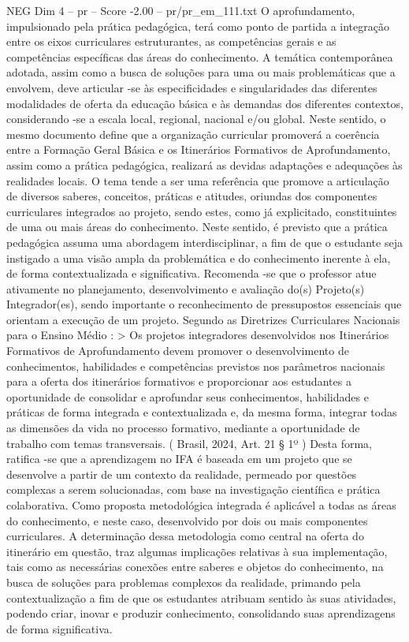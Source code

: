 \begin{textsample}{NEG Dim 4 – pr – Score -2.00 – pr/pr\_em\_111.txt}
O aprofundamento, impulsionado pela prática pedagógica, terá como ponto de partida a integração entre os eixos curriculares estruturantes, as competências gerais e as competências específicas das áreas do conhecimento.
A temática contemporânea adotada, assim como a busca de soluções para uma ou mais problemáticas que a envolvem, deve articular -se às especificidades e singularidades das diferentes modalidades de oferta da educação básica e às demandas dos diferentes contextos, considerando -se a escala local, regional, nacional e/ou global.
Neste sentido, o mesmo documento define que a organização curricular promoverá a coerência entre a Formação Geral Básica e os Itinerários Formativos de Aprofundamento, assim como a prática pedagógica, realizará as devidas adaptações e adequações às realidades locais.
O tema tende a ser uma referência que promove a articulação de diversos saberes, conceitos, práticas e atitudes, oriundas dos componentes curriculares integrados ao projeto, sendo estes, como já explicitado, constituintes de uma ou mais áreas do conhecimento.
Neste sentido, é previsto que a prática pedagógica assuma uma abordagem interdisciplinar, a fim de que o estudante seja instigado a uma visão ampla da problemática e do conhecimento inerente à ela, de forma contextualizada e significativa.
Recomenda -se que o professor atue ativamente no planejamento, desenvolvimento e avaliação do(s) Projeto(s) Integrador(es), sendo importante o reconhecimento de pressupostos essenciais que orientam a execução de um projeto.
Segundo as Diretrizes Curriculares Nacionais para o Ensino Médio : > Os projetos integradores desenvolvidos nos Itinerários Formativos de Aprofundamento devem promover o desenvolvimento de conhecimentos, habilidades e competências previstos nos parâmetros nacionais para a oferta dos itinerários formativos e proporcionar aos estudantes a oportunidade de consolidar e aprofundar seus conhecimentos, habilidades e práticas de forma integrada e contextualizada e, da mesma forma, integrar todas as dimensões da vida no processo formativo, mediante a oportunidade de trabalho com temas transversais. ( Brasil, 2024, Art. 21 § 1º ) Desta forma, ratifica -se que a aprendizagem no IFA é baseada em um projeto que se desenvolve a partir de um contexto da realidade, permeado por questões complexas a serem solucionadas, com base na investigação científica e prática colaborativa.
Como proposta metodológica integrada é aplicável a todas as áreas do conhecimento, e neste caso, desenvolvido por dois ou mais componentes curriculares.
A determinação dessa metodologia como central na oferta do itinerário em questão, traz algumas implicações relativas à sua implementação, tais como as necessárias conexões entre saberes e objetos do conhecimento, na busca de soluções para problemas complexos da realidade, primando pela contextualização a fim de que os estudantes atribuam sentido às suas atividades, podendo criar, inovar e produzir conhecimento, consolidando suas aprendizagens de forma significativa.

\end{textsample}
